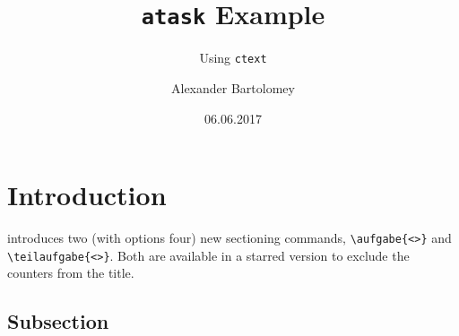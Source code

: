 \documentclass{ctext}
\title{\texttt{atask} Example}
\subtitle{Using \texttt{ctext}}
\author{Alexander Bartolomey}
\date{06.06.2017}
\begin{document}
\maketitle
\tableofcontents*

\section{Introduction}
\atask introduces two (with options four) new sectioning commands, \verb|\aufgabe{<>}| and \\ \verb|\teilaufgabe{<>}|. Both are available in a starred version to exclude the counters from the title.
\subsection{Subsection}
\aufgabe{}
\lipsum[1-2]
\teilaufgabe{}
\lipsum[1]
\lipsum[1]
\teilaufgabe{}
\lipsum[1]
\aufgabe{}
\lipsum[1-6]
\end{document}
